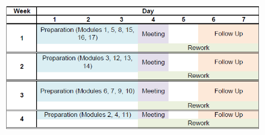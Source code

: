 \begin{figure}[!h]
    \centering
    \includegraphics[width=0.9\linewidth]{figures/DesignDef_Schedule.png}
\end{figure}